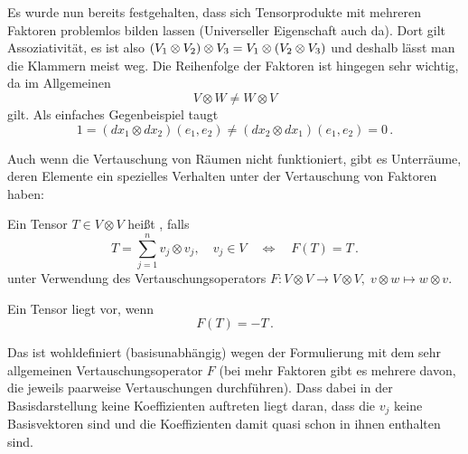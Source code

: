 \documentclass[../H_Analysis_main.tex]{subfiles}
\begin{document}
Es wurde nun bereits festgehalten, dass sich Tensorprodukte mit mehreren Faktoren problemlos bilden lassen (Universeller Eigenschaft auch da). Dort gilt Assoziativität, es ist also $\qty(V_1 \otimes V_2) \otimes V_3 = V_1 \otimes \qty(V_2 \otimes V_3)$ und deshalb lässt man die Klammern meist weg. Die Reihenfolge der Faktoren ist hingegen sehr wichtig, da im Allgemeinen
\begin{equation}
V \otimes W \neq W \otimes V
\end{equation}
gilt. Als einfaches Gegenbeispiel taugt
\begin{equation*}
1 = (dx_1 \otimes dx_2)(e_1, e_2) \neq (dx_2 \otimes dx_1)(e_1, e_2) = 0 \, .
\end{equation*}

Auch wenn die Vertauschung von Räumen nicht funktioniert, gibt es Unterräume, deren Elemente ein spezielles Verhalten unter der Vertauschung von Faktoren haben:
\begin{defi}
Ein Tensor $T \in V \otimes V$ heißt , falls
\begin{equation}
T = \sum_{j = 1}^n v_j \otimes v_j, \quad v_j \in V \quad \Leftrightarrow \quad F(T) = T \, .
\end{equation}
unter Verwendung des Vertauschungsoperators $F: V \otimes V \rightarrow V \otimes V, \; v \otimes w \mapsto w \otimes v$.

Ein  Tensor liegt vor, wenn
\begin{equation}
F(T) = -T \, .
\end{equation}
\end{defi}
Das ist wohldefiniert (basisunabhängig) wegen der Formulierung mit dem sehr allgemeinen Vertauschungsoperator $F$ (bei mehr Faktoren gibt es mehrere davon, die jeweils paarweise Vertauschungen durchführen). Dass dabei in der Basisdarstellung keine Koeffizienten auftreten liegt daran, dass die $v_j$ keine Basisvektoren sind und die Koeffizienten damit quasi schon in ihnen enthalten sind.
\end{document}
